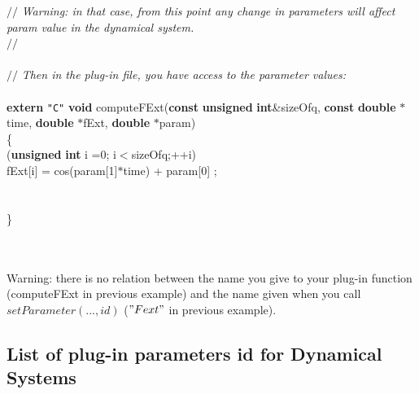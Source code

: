 \documentclass[10pt]{article}
\begin{document}
\begin{flushleft}
{$//$\it{} Warning: in that case, from this point any change in parameters will affect param value in the dynamical system.{}\mbox{}\\
}{$//$\it{} {}\mbox{}\\
}\mbox{}\\
{$//$\it{} Then in the plug-in file, you have access to the parameter values: {}\mbox{}\\
}\mbox{}\\
{\bf extern} {\tt"C"} {\bf void} computeFExt({\bf const} {\bf unsigned} {\bf int}\&sizeOfq, {\bf const} {\bf double} $\ast$time, {\bf double} $\ast$fExt, {\bf double} $\ast$param)\mbox{}\\
\{\mbox{}\\
\hspace*{2\indentation}{\bf for}({\bf unsigned} {\bf int} i =0; i$<$sizeOfq;++i)\mbox{}\\
\hspace*{4\indentation}fExt[i] = cos(param[1]$\ast$time) + param[0] ;\mbox{}\\
\mbox{}\\
\mbox{}\\
\}\mbox{}\\
\mbox{}\\
\mbox{}\\
\end{flushleft}

Warning: there is no relation between the name you give to your plug-in function (computeFExt in previous example) and the 
name given when you call $setParameter(..., id)$ ($"Fext"$ in previous example). 

\subsection{List of plug-in parameters id for Dynamical Systems}
\end{document}
